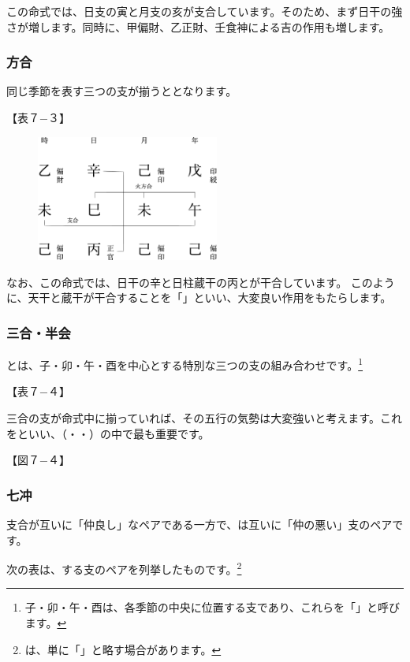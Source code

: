\documentclass[a5paper,11pt,dvipdfmx]{tarticle}
\begin{document}
この命式では、日支の寅と月支の亥が支合しています。そのため、まず日干の強さが増します。同時に、甲偏財、乙正財、壬食神による吉の作用も増します。

\subsubsection*{方合}
同じ季節を表す三つの支が揃うととなります。

【表７−３】

\begin{figure}[h]
  \includegraphics[width=60mm,angle=90]{figs/figure7-3.eps}
\end{figure}

なお、この命式では、日干の辛と日柱蔵干の丙とが干合しています。
このように、天干と蔵干が干合することを「」といい、大変良い作用をもたらします。

\subsubsection*{三合・半会}
とは、子・卯・午・酉を中心とする特別な三つの支の組み合わせです。\footnote{子・卯・午・酉は、各季節の中央に位置する支であり、これらを「」と呼びます。}

【表７−４】

三合の支が命式中に揃っていれば、その五行の気勢は大変強いと考えます。これをといい、（・・）の中で最も重要です。

【図７−４】

\subsubsection*{七冲}
支合が互いに「仲良し」なペアである一方で、は互いに「仲の悪い」支のペアです。

次の表は、する支のペアを列挙したものです。\footnote{は、単に「」と略す場合があります。}
\end{document}
